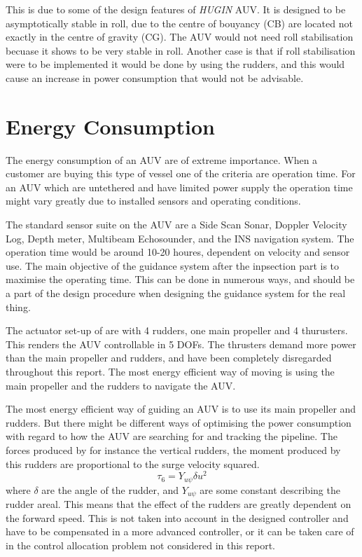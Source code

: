 	This is due to some of the design features of \textit{HUGIN} AUV. It is designed to be
	asymptotically stable in roll, due to the centre of bouyancy (CB) are located not exactly in the centre of
	gravity (CG). The AUV would not need roll stabilisation becuase it shows to be very stable in roll.
	Another case is that if roll stabilisation were to be implemented it would be done by using the
	rudders, and this would cause an increase in power consumption that would not be advisable. 


\section{Energy Consumption}
	The energy consumption of an AUV are of extreme importance. When a customer are buying this type of
	vessel one of the criteria are operation time. For an AUV which are untethered and have limited power 
	supply the operation time might vary greatly due to installed sensors and operating conditions.

	The standard sensor suite on the \hugin AUV are a Side Scan Sonar, Doppler Velocity Log, Depth meter,
	Multibeam Echosounder, and the INS navigation system. The operation time would be around 10-20 houres,
	dependent on velocity and sensor use. The main objective of the guidance system after the inpsection
	part is to maximise the operating time. This can be done in numerous ways, and should be a part of the
	design procedure when designing the guidance system for the real thing.

	The actuator set-up of \hugin  are with 4 rudders, one main propeller and 4 thurusters. This renders
	the AUV controllable in 5 DOFs. The thrusters demand more power than the main propeller
	and rudders, and have been completely disregarded throughout this report. The most energy efficient
	way of moving is using the main propeller and the rudders to navigate the AUV.

	The most energy efficient way of guiding an AUV is to use its main propeller and rudders. But there
	might be different ways of optimising the power consumption with regard to how the AUV are searching
	for and tracking the pipeline. The forces produced by for instance the vertical rudders, the moment
	produced by this rudders are proportional to the surge velocity squared.
		\begin{equation}
			\tau_6 = Y_{u\psi} \delta u^2
		\end{equation}
	where $\delta$ are the angle of the rudder, and $Y_{u \psi}$ are some constant describing the rudder
	areal. This means that the effect of the rudders are greatly dependent on the forward speed. This is
	not taken into account in the designed controller and have to be compensated in a more advanced
	controller, or it can be taken care of in the control allocation problem not considered in this
	report.  

